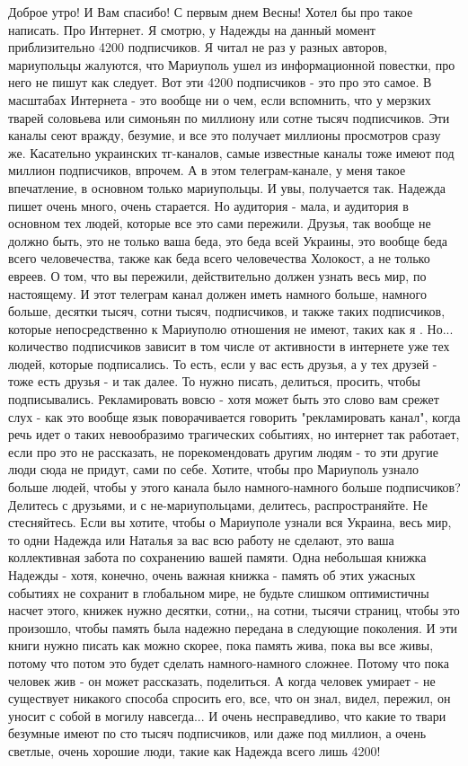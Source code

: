 Доброе утро! И Вам спасибо! С первым днем Весны! Хотел бы про такое написать.
Про Интернет. Я смотрю, у Надежды на данный момент приблизительно 4200
подписчиков. Я читал не раз у разных авторов, мариупольцы жалуются, что
Мариуполь ушел из информационной повестки, про него не пишут как следует. Вот
эти 4200 подписчиков - это про это самое. В масштабах Интернета - это вообще ни
о чем, если вспомнить, что у мерзких тварей соловьева или симоньян по миллиону
или сотне тысяч подписчиков. Эти каналы сеют вражду, безумие, и все это
получает миллионы просмотров сразу же. Касательно украинских тг-каналов, самые
известные каналы тоже имеют под миллион подписчиков, впрочем. А в этом
телеграм-канале, у меня такое впечатление, в основном только мариупольцы. И
увы, получается так. Надежда пишет очень много, очень старается. Но аудитория -
мала, и аудитория в основном тех людей, которые все это сами пережили. Друзья,
так вообще не должно быть, это не только ваша беда, это беда всей Украины, это
вообще беда всего человечества, также как беда всего человечества Холокост, а
не только евреев. О том, что вы пережили, действительно должен узнать весь мир,
по настоящему. И этот телеграм канал должен иметь намного больше, намного
больше, десятки тысяч, сотни тысяч, подписчиков, и также таких подписчиков,
которые непосредственно к Мариуполю отношения не имеют, таких как я . Но...
количество подписчиков зависит в том числе от активности в интернете уже тех
людей, которые подписались. То есть, если у вас есть друзья, а у тех друзей -
тоже есть друзья - и так далее. То нужно писать, делиться, просить, чтобы
подписывались. Рекламировать вовсю - хотя может быть это слово вам срежет слух
- как это вообще язык поворачивается говорить "рекламировать канал",  когда
речь идет о таких невообразимо трагических событиях, но интернет так работает,
если про это не рассказать, не порекомендовать другим людям - то эти другие
люди сюда не придут, сами по себе. Хотите, чтобы про Мариуполь узнало больше
людей, чтобы у этого канала было намного-намного больше подписчиков? Делитесь с
друзьями, и с не-мариупольцами, делитесь, распространяйте. Не стесняйтесь. Если
вы хотите, чтобы о Мариуполе узнали вся Украина, весь мир, то одни Надежда или
Наталья за вас всю работу не сделают, это ваша коллективная забота по
сохранению вашей памяти. Одна небольшая книжка Надежды - хотя, конечно, очень
важная книжка - память об этих ужасных событиях не сохранит в глобальном мире,
не будьте слишком оптимистичны насчет этого, книжек нужно десятки, сотни,, на
сотни, тысячи страниц, чтобы это произошло, чтобы память была надежно передана
в следующие поколения. И эти книги нужно писать как можно скорее, пока память
жива, пока вы все живы, потому что потом это будет сделать намного-намного
сложнее. Потому что пока человек жив - он может рассказать, поделиться. А когда
человек умирает - не существует никакого способа спросить его, все, что он
знал, видел, пережил, он уносит с собой в могилу навсегда... И очень
несправедливо, что какие то твари безумные имеют по сто тысяч подписчиков, или
даже под миллион, а очень светлые, очень хорошие люди, такие как Надежда всего
лишь 4200!

